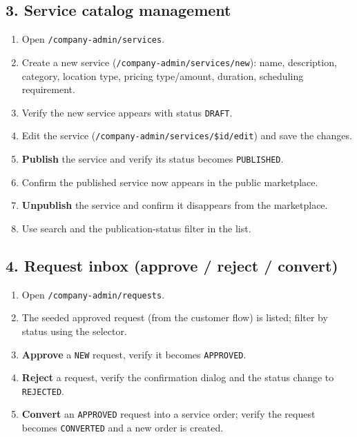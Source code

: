 \documentclass[11pt,a4paper]{article}
\begin{document}
\subsection{3. Service catalog management}
\begin{enumerate}[leftmargin=2em, itemsep=2pt]
  \item Open \texttt{/company-admin/services}.
  \item Create a new service (\texttt{/company-admin/services/new}): name, description, category, location type, pricing type/amount, duration, scheduling requirement.
  \item Verify the new service appears with status \texttt{DRAFT}.
  \item Edit the service (\texttt{/company-admin/services/\$id/edit}) and save the changes.
  \item \textbf{Publish} the service and verify its status becomes \texttt{PUBLISHED}.
  \item Confirm the published service now appears in the public marketplace.
  \item \textbf{Unpublish} the service and confirm it disappears from the marketplace.
  \item Use search and the publication-status filter in the list.
\end{enumerate}

\subsection{4. Request inbox (approve / reject / convert)}
\begin{enumerate}[leftmargin=2em, itemsep=2pt]
  \item Open \texttt{/company-admin/requests}.
  \item The seeded approved request (from the customer flow) is listed; filter by status using the selector.
  \item \textbf{Approve} a \texttt{NEW} request, verify it becomes \texttt{APPROVED}.
  \item \textbf{Reject} a request, verify the confirmation dialog and the status change to \texttt{REJECTED}.
  \item \textbf{Convert} an \texttt{APPROVED} request into a service order; verify the request becomes \texttt{CONVERTED} and a new order is created.
\end{enumerate}
\end{document}
